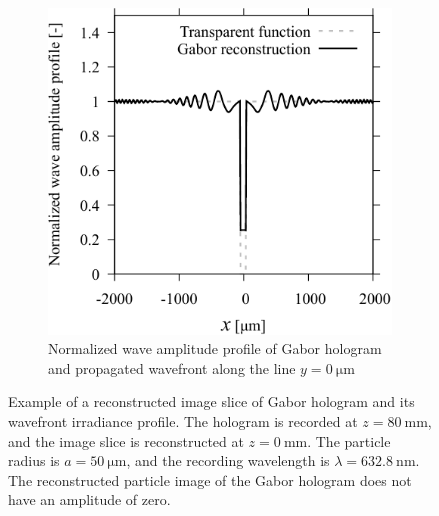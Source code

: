 \begin{figure}[htbp]
\begin{subfigure}[t]{0.48\linewidth}
        \includegraphics[width=\linewidth]{./Figure/2_Theory/twin_image/profile.pdf}
        \caption{Normalized wave amplitude profile of Gabor hologram and propagated wavefront along the line $y=\SI{0}{\um}$ }
        \label{fig:twinImage:profile}
    \end{subfigure}

    \caption{Example of a reconstructed image slice of Gabor hologram and its wavefront irradiance profile. The hologram is recorded at $z=\SI{80}{\mm}$, and the image slice is reconstructed at $z=\SI{0}{\mm}$. The particle radius is $a=\SI{50}{\um}$, and the recording wavelength is $\lambda = \SI{632.8}{\nm}$. The reconstructed particle image of the Gabor hologram does not have an amplitude of zero.}
    \label{fig:twinImage}
\end{figure}

